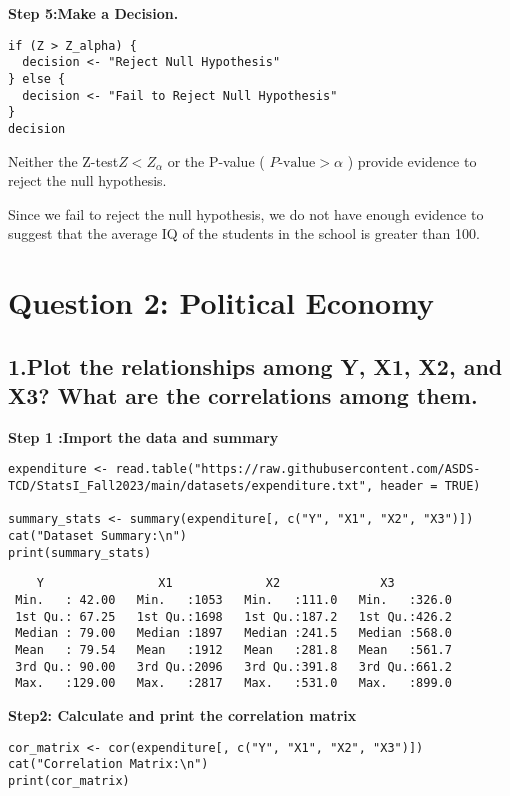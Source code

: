 \documentclass[12pt]{article}
\begin{document}
\textbf{Step 5:Make a Decision.}
\begin{lstlisting}[style=my]
if (Z > Z_alpha) {
  decision <- "Reject Null Hypothesis"
} else {
  decision <- "Fail to Reject Null Hypothesis"
}
decision
\end{lstlisting}

Neither the Z-test$Z < Z_\alpha$ or the P-value (
\(P\text{-value} > \alpha\) ) provide evidence to reject the null hypothesis.

Since we fail to reject the null hypothesis, we do not have enough evidence to suggest that the average IQ of the students in the school is greater than 100. 

\newpage
\section*{Question 2: Political Economy}

\subsection*{1.Plot the relationships among Y, X1, X2, and X3? What are the correlations among them.}
\textbf{Step 1 :Import the data and summary }

\begin{lstlisting}[style=my]
expenditure <- read.table("https://raw.githubusercontent.com/ASDS-TCD/StatsI_Fall2023/main/datasets/expenditure.txt", header = TRUE)

summary_stats <- summary(expenditure[, c("Y", "X1", "X2", "X3")])
cat("Dataset Summary:\n")
print(summary_stats)

\end{lstlisting}

\begin{verbatim}
    Y                X1             X2              X3       
 Min.   : 42.00   Min.   :1053   Min.   :111.0   Min.   :326.0  
 1st Qu.: 67.25   1st Qu.:1698   1st Qu.:187.2   1st Qu.:426.2  
 Median : 79.00   Median :1897   Median :241.5   Median :568.0  
 Mean   : 79.54   Mean   :1912   Mean   :281.8   Mean   :561.7  
 3rd Qu.: 90.00   3rd Qu.:2096   3rd Qu.:391.8   3rd Qu.:661.2  
 Max.   :129.00   Max.   :2817   Max.   :531.0   Max.   :899.0 

\end{verbatim}

\textbf{Step2: Calculate and print the correlation matrix }
\begin{lstlisting}[style=my]
cor_matrix <- cor(expenditure[, c("Y", "X1", "X2", "X3")])
cat("Correlation Matrix:\n")
print(cor_matrix)
    
\end{lstlisting}
\end{document}
